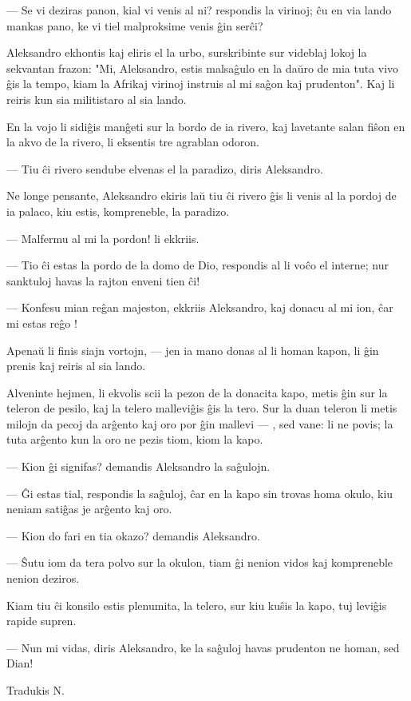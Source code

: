  --- Se vi deziras panon, kial vi venis al ni? respondis la virinoj;
\^cu en via lando mankas pano, ke vi tiel malproksime venis \^gin
ser\^ci?

   Aleksandro ekhontis kaj eliris el la urbo, surskribinte sur videblaj
lokoj la sekvantan frazon: "Mi, Aleksandro, estis malsa\^gulo en la
da\u uro de mia tuta vivo \^gis la tempo, kiam la Afrikaj virinoj
instruis al mi sa\^gon kaj prudenton". Kaj li reiris kun sia
militistaro al sia lando.

   En la vojo li sidi\^gis man\^geti sur la bordo de ia rivero, kaj
lavetante salan fi\^son en la akvo de la rivero, li eksentis tre
agrablan odoron.

 --- Tiu \^ci rivero sendube elvenas el la paradizo, diris Aleksandro.

   Ne longe pensante, Aleksandro ekiris la\u u tiu \^ci rivero \^gis li
venis al la pordoj de ia palaco, kiu estis, kompreneble, la
paradizo.

 --- Malfermu al mi la pordon! li ekkriis.

 --- Tio \^ci estas la pordo de la domo de Dio, respondis al li vo\^co el
interne; nur sanktuloj havas la rajton enveni tien \^ci!

 --- Konfesu mian re\^gan majeston, ekkriis Aleksandro, kaj donacu al mi
ion, \^car mi estas re\^go !

   Apena\u u li finis siajn vortojn, --- jen ia mano donas al li homan
kapon, li \^gin prenis kaj reiris al sia lando.

   Alveninte hejmen, li ekvolis scii la pezon de la donacita kapo, metis
\^gin sur la teleron de pesilo, kaj la telero mallevi\^gis \^gis la
tero. Sur la duan teleron li metis milojn da pecoj da ar\^gento kaj
oro por \^gin mallevi --- , sed vane: li ne povis; la tuta ar\^gento
kun la oro ne pezis tiom, kiom la kapo.

 --- Kion \^gi signifas? demandis Aleksandro la sa\^gulojn.

 --- \^Gi estas tial, respondis la sa\^guloj, \^car en la kapo sin trovas
homa okulo, kiu neniam sati\^gas je ar\^gento kaj oro.

 --- Kion do fari en tia okazo? demandis Aleksandro.

 --- \^Sutu iom da tera polvo sur la okulon, tiam \^gi nenion vidos kaj
kompreneble nenion deziros.

   Kiam tiu \^ci konsilo estis plenumita, la telero, sur kiu ku\^sis la
kapo, tuj levi\^gis rapide supren.

 --- Nun mi vidas, diris Aleksandro, ke la sa\^guloj havas prudenton ne
homan, sed Dian!

\begin{flushright}
\footnotesize Tradukis N. 
\end{flushright}

\smallrule{}
